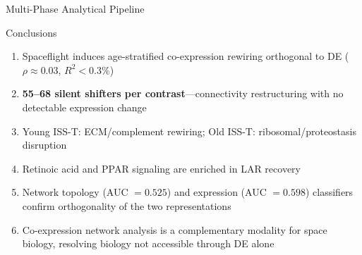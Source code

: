 \documentclass[final]{beamer}
\newlength{\colwidth}
\begin{document}
\begin{frame}[t]
\begin{columns}[t]
\begin{column}{\colwidth}
\begin{block}{Multi-Phase Analytical Pipeline}
\begin{center}
{%
    }
    \end{center}
  \end{block}

  \begin{alertblock}{Conclusions}
    \vspace{0.5ex}
    \begin{enumerate}\setlength\itemsep{0.4ex}
      \item Spaceflight induces age-stratified co-expression rewiring
        orthogonal to DE ($\rho \approx 0.03$, $R^2 < 0.3\%$)
      \item \textbf{55--68 silent shifters per contrast}---connectivity
        restructuring with no detectable expression change
      \item Young ISS-T: ECM/complement rewiring;\;
        Old ISS-T: ribosomal/proteostasis disruption
      \item Retinoic acid and PPAR signaling are enriched in LAR recovery
      \item Network topology (AUC $= 0.525$) and expression
        (AUC $= 0.598$) classifiers confirm orthogonality of the two
        representations
      \item Co-expression network analysis is a complementary modality for
        space biology, resolving biology not accessible through DE alone
    \end{enumerate}
  \end{alertblock}


\end{column}
\end{columns}
\end{frame}
\end{document}
